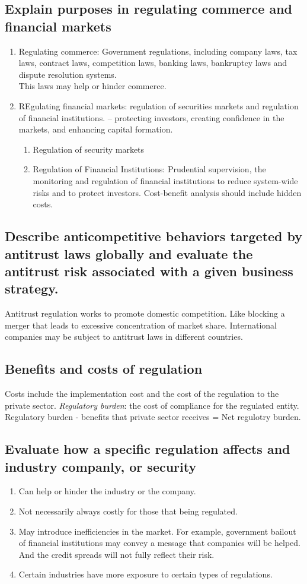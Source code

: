 \documentclass{article}
\newcommand{\be}{\begin{enumerate}}
\newcommand{\ee}{\end{enumerate}}
\begin{document}
\subsection{Explain purposes in regulating commerce and financial markets}
\be
    \item  Regulating commerce: Government regulations, including company laws, tax laws,
        contract laws, competition laws, banking laws, bankruptcy laws and dispute resolution systems.
        \\This laws may help or hinder commerce.
    \item REgulating financial markets: regulation of securities markets and regulation of 
                financial institutions. -- protecting investors, creating confidence in
                the markets, and enhancing capital formation.
        \be
            \item Regulation of security markets
            \item Regulation of Financial Institutions: Prudential supervision,
                the monitoring and regulation of financial institutions to reduce
                system-wide risks and to protect investors. Cost-benefit analysis should include
                hidden costs.
        \ee
\ee
\subsection{Describe anticompetitive behaviors targeted by antitrust laws globally and evaluate
the antitrust risk associated with a given business strategy.}
Antitrust regulation works to promote domestic competition. Like blocking a merger that leads to
excessive concentration of market share. International companies may be subject to antitrust
laws in different countries.
\subsection{Benefits and costs of regulation}
Costs include the implementation cost and the cost of the regulation to the private
sector.
{\it Regulatory burden}: the cost of compliance for the regulated entity. 
Regulatory burden - benefits that private sector receives = Net regulotry burden.
\subsection{Evaluate how a specific regulation affects and industry companly, or security}
\be
    \item Can help or hinder the industry or the company.
    \item Not necessarily always costly for those that being regulated.
    \item May introduce inefficiencies in the market. For example, government bailout of financial
        institutions may convey a message that companies will be helped. And the credit
        spreads will not fully reflect their risk.
    \item Certain industries have more exposure to certain types of regulations.
\ee
\end{document}
